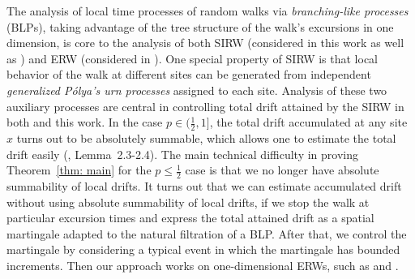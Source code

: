 \documentclass[twoside,12pt, a4paper, final]{article}
\numberwithin{equation}{section}
\theoremstyle{remark}
\newcommand\TBD{\textcolor{red}{TBD.}}
\begin{document}
	
	The analysis of local time processes of random walks via \textit{branching-like processes} (BLPs), taking advantage of the tree structure of the walk's excursions in one dimension, is core to the analysis of both SIRW (considered in this work as well as \cite{T96, KMP23}) and ERW (considered in \cite{DK12, KP16, KMP22}). 
	One special property of SIRW is that local behavior of the walk at different sites can be generated from independent \textit{generalized P\'olya's urn processes} assigned to each site.
	Analysis of these two auxiliary processes are central in controlling total drift attained by the SIRW in both \cite{KMP23} and this work.
	In the case $p \in (\frac{1}{2}, 1]$, the total drift accumulated at any site $x$ turns out to be absolutely summable, which allows one to estimate the total drift easily (\cite{KMP23}, Lemma~2.3-2.4).
	The main technical difficulty in proving Theorem~\ref{thm: main} for the $p \le \frac{1}{2}$ case is that we no longer have absolute summability of local drifts.
	It turns out that we can estimate accumulated drift without using absolute summability of local drifts, if we stop the walk at particular excursion times and express the total attained drift as a spatial martingale adapted to the natural filtration of a BLP. After that, we control the martingale by considering a typical event in which the martingale has bounded increments.
	Then our approach works on one-dimensional ERWs, such as \cite{DK12} and \cite{KP16}.
	
	
	
\end{document}

